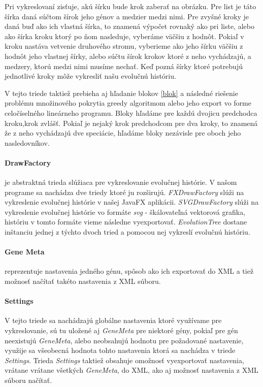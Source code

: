 Pri vykreslovaní zisťuje, akú šírku bude krok zaberať na obrázku. Pre list je táto šírka daná súčtom šírok jeho génov a medzier medzi nimi. 
Pre zvyšné kroky je daná buď ako ich vlastná šírka, to znamená výpočet rovnaký ako pri liste, alebo ako šírka kroku ktorý po ňom nasleduje, vyberáme väčšiu z hodnôt.
Pokiaľ v kroku nastáva vetvenie druhového stromu, vyberieme ako jeho šírku väčšiu z hodnôt jeho vlastnej šírky, alebo súčtu šírok krokov ktoré z neho vychádzajú, a medzery, ktorú medzi nimi musíme nechať.
Keď pozná šírky ktoré potrebujú jednotlivé kroky môže vykresliť našu evolučnú históriu.

V tejto triede taktiež prebieha aj hľadanie blokov \ref{blok} a následné riešenie problému množinového pokrytia greedy algoritmom alebo jeho export vo forme celočíselného lineárneho programu.
Bloky hľadáme pre každú dvojicu predchodca kroku,krok zvlášť. Pokiaľ je nejaký krok predchodcom pre dva kroky, to znamená že z neho vychádzajú dve speciácie, hľadáme bloky nezávisle pre oboch jeho nasledovníkov.
\paragraph{DrawFactory} je abstraktná trieda slúžiaca pre vykreslovanie evolučnej histórie. V našom programe sa nachádza dve triedy ktoré ju rozširujú.
\emph{FXDrawFactory} slúži na vykreslenie evolučnej histórie v našej JavaFX aplikácii. \emph{SVGDrawFactory} slúži na vykreslenie evolučnej histórie vo formáte \emph{svg} - škálovateľná vektorová grafika, históriu v tomto formáte vieme následne vyexportovať.
\emph{EvolutionTree} dostane inštanciu jednej z týchto dvoch tried a pomocou nej vykreslí evolučnú históriu.
\paragraph{Gene Meta} reprezentuje nastavenia jedného génu, spôsob ako ich exportovať do XML a tiež možnosť načítať takéto nastavenia z XML súboru.
\paragraph{Settings} V tejto triede sa nachádzajú globálne nastavenia ktoré využívame pre vykreslovanie, sú tu uložené aj \emph{GeneMeta} pre niektoré gény,
pokiaľ pre gén neexistujú \emph{GeneMeta}, alebo neobsahujú hodnotu pre požadované nastavenie, využije sa všeobecná hodnota tohto nastavenia ktorá sa nachádza v triede \emph{Settings}.
Trieda \emph{Settings} taktiež obsahuje omožnosť vyexportovať nastavenia, vrátane vrátane všetkých \emph{GeneMeta}, do XML, ako aj možnosť nastavenia z XML súboru načítať.

